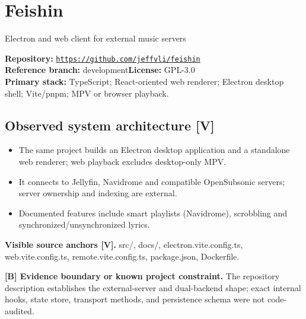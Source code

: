 \documentclass[10pt,a4paper,oneside]{report}
\newcommand{\tagboundary}{\textbf{[B] Evidence boundary or known project constraint.}}
\newcommand{\sourceurl}[1]{\href{#1}{\texttt{\nolinkurl{#1}}}}
\begin{document}
\chapter{Feishin}
{\large\color{muted}Electron and web client for external music servers}\par
\begin{evidencebox}\small\textbf{Repository:} \sourceurl{https://github.com/jeffvli/feishin}\\\textbf{Reference branch:} development\qquad \textbf{License:} GPL-3.0\\\textbf{Primary stack:} TypeScript; React-oriented web renderer; Electron desktop shell; Vite/pnpm; MPV or browser playback.\end{evidencebox}
\section{Observed system architecture [V]}
\begin{itemize}[leftmargin=*,itemsep=2pt,topsep=3pt]
\item The same project builds an Electron desktop application and a standalone web renderer; web playback excludes desktop-only MPV.
\item It connects to Jellyfin, Navidrome and compatible OpenSubsonic servers; server ownership and indexing are external.
\item Documented features include smart playlists (Navidrome), scrobbling and synchronized/unsynchronized lyrics.
\end{itemize}
\textbf{Visible source anchors [V].} src/, docs/, electron.vite.config.ts, web.vite.config.ts, remote.vite.config.ts, package.json, Dockerfile.\par
\begin{evidencebox}\tagboundary{} The repository description establishes the external-server and dual-backend shape; exact internal hooks, state store, transport methods, and persistence schema were not code-audited.\end{evidencebox}
\end{document}
